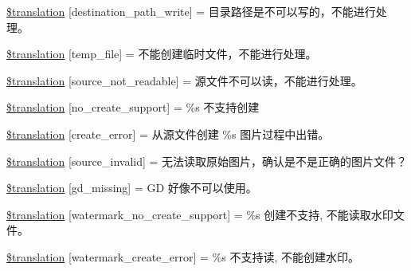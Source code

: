\begin{DoxyCompactItemize}
\item 
\hyperlink{class_8upload_8zh___c_n_8php_a40e4e1962226b89fd76da5819a9602b0}{\$translation} \mbox{[}\textquotesingle{}destination\+\_\+path\+\_\+write\textquotesingle{}\mbox{]} = \textquotesingle{}目录路径是不可以写的，不能进行处理。\textquotesingle{}
\item 
\hyperlink{class_8upload_8zh___c_n_8php_a2baece8da11e20d45175db91851ec3e3}{\$translation} \mbox{[}\textquotesingle{}temp\+\_\+file\textquotesingle{}\mbox{]} = \textquotesingle{}不能创建临时文件，不能进行处理。\textquotesingle{}
\item 
\hyperlink{class_8upload_8zh___c_n_8php_a922967ca2df0efdd455261142d8e5715}{\$translation} \mbox{[}\textquotesingle{}source\+\_\+not\+\_\+readable\textquotesingle{}\mbox{]} = \textquotesingle{}源文件不可以读，不能进行处理。\textquotesingle{}
\item 
\hyperlink{class_8upload_8zh___c_n_8php_a346dfd1ade29f583dd20d345c436859f}{\$translation} \mbox{[}\textquotesingle{}no\+\_\+create\+\_\+support\textquotesingle{}\mbox{]} = \textquotesingle{}\%s 不支持创建\textquotesingle{}
\item 
\hyperlink{class_8upload_8zh___c_n_8php_a53013ce9255c4e1849098ddd9fdb2b3f}{\$translation} \mbox{[}\textquotesingle{}create\+\_\+error\textquotesingle{}\mbox{]} = \textquotesingle{}从源文件创建 \%s 图片过程中出错。\textquotesingle{}
\item 
\hyperlink{class_8upload_8zh___c_n_8php_a6ab0a660b457eaf2d3434b225449fdd6}{\$translation} \mbox{[}\textquotesingle{}source\+\_\+invalid\textquotesingle{}\mbox{]} = \textquotesingle{}无法读取原始图片，确认是不是正确的图片文件？\textquotesingle{}
\item 
\hyperlink{class_8upload_8zh___c_n_8php_a7f3dfcc0db4bbc0f2e7210c439798e56}{\$translation} \mbox{[}\textquotesingle{}gd\+\_\+missing\textquotesingle{}\mbox{]} = \textquotesingle{}G\+D 好像不可以使用。\textquotesingle{}
\item 
\hyperlink{class_8upload_8zh___c_n_8php_a82d5853430ab72dc1f9799ec36144cc6}{\$translation} \mbox{[}\textquotesingle{}watermark\+\_\+no\+\_\+create\+\_\+support\textquotesingle{}\mbox{]} = \textquotesingle{}\%s 创建不支持, 不能读取水印文件。\textquotesingle{}
\item 
\hyperlink{class_8upload_8zh___c_n_8php_aabca0b65dadbc6184415c16375f284ca}{\$translation} \mbox{[}\textquotesingle{}watermark\+\_\+create\+\_\+error\textquotesingle{}\mbox{]} = \textquotesingle{}\%s 不支持读, 不能创建水印。\textquotesingle{}
\item 

\end{DoxyCompactItemize}
